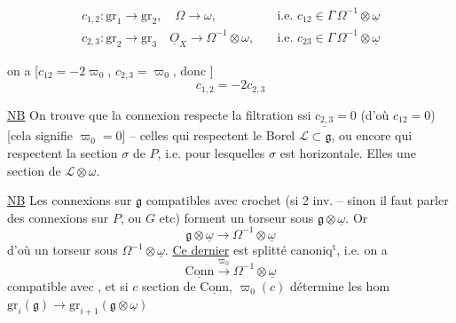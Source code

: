 \[ \begin{aligned}
 c_{1,2}:\mathrm{gr}_1\longrightarrow\mathrm{gr}_2,\quad \Omega\longrightarrow\omega,&\quad\text{i.e. }c_{12}\in\Gamma\,\Omega^{-1}\otimes\underline\omega\\
 c_{2,3}:\mathrm{gr}_2\longrightarrow\mathrm{gr}_3\quad \underline O_X\longrightarrow\Omega^{-1}\otimes\omega,&\quad\text{i.e. }c_{23}\in\Gamma\,\Omega^{-1}\otimes\underline\omega
 \end{aligned} \]

on a [$c_{12}=-2\varpi_0$, $c_{2,3}=\varpi_0$, donc ]
\[ \boxed{c_{1,2}=-2c_{2,3}} \]

\uline{NB} On trouve que la connexion respecte la filtration ssi $\underline{c_{2,3}}=0$ (d'où $c_{12}=0$) [cela signifie $\varpi_0=0$] --  celles qui respectent le Borel $\mathscr L\subset\mathfrak g$, ou encore  qui respectent la section $\sigma$ de $P$, i.e. pour lesquelles $\sigma$ est horizontale. Elles   une section de $\mathscr L\otimes\omega$. 


\uline{NB} Les connexions sur $\mathfrak g$ compatibles avec crochet  (si 2 inv. -- sinon il faut parler des connexions sur $P$, ou $G$ etc) forment un torseur sous $\mathfrak g\otimes\underline\omega$. Or
\[ \mathfrak g\otimes\underline\omega\longrightarrow \Omega^{-1}\otimes\underline\omega \]
d'où un torseur sous $\Omega^{-1}\otimes\underline\omega$. \uline{Ce dernier} est splitté canoniq$^{\mathrm{t}}$, i.e. on a
\[ \underline{\mathrm{Conn}}\xrightarrow{\varpi_0}\Omega^{-1}\otimes\underline\omega \]
compatible avec , et si $c$ section de $\underline{\mathrm{Conn}}$, $\varpi_0(c)$ détermine les hom $\mathrm{gr}_i(\mathfrak g)\to\mathrm{gr}_{i+1}(\mathfrak g\otimes\underline\omega)$

